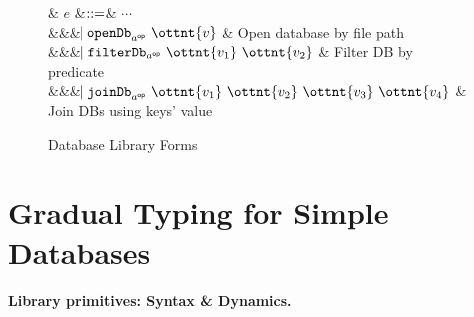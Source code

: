 \begin{figure}
  \begin{grammar}
  & $e$
    &$\mathrel{::=}$& $\cdots$
    \\ &&& $\bnfaltbrk  \texttt{openDb}_{ a^{\textsf{op} } }~ \ottnt{v} $ & Open database by file path
    \\ &&& $\bnfaltbrk  \texttt{filterDb}_{ a^{\textsf{op} } }~ \ottnt{v_{{\mathrm{1}}}} ~ \ottnt{v_{{\mathrm{2}}}} $ & Filter DB by predicate
    \\ &&& $\bnfaltbrk  \texttt{joinDb}_{ a^{\textsf{op} } }~ \ottnt{v_{{\mathrm{1}}}} ~ \ottnt{v_{{\mathrm{2}}}} ~ \ottnt{v_{{\mathrm{3}}}} ~ \ottnt{v_{{\mathrm{4}}}} $ & Join DBs using keys' value
\end{grammar}
\caption{Database Library Forms}
\end{figure}

\section{Gradual Typing for Simple Databases}


\paragraph{Library primitives: Syntax \& Dynamics.}

